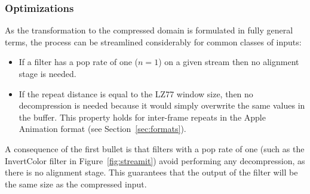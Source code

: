 \subsubsection{Optimizations}
\label{sec:opt}

As the transformation to the compressed domain is formulated in
fully general terms, the process can be streamlined considerably for
common classes of inputs:
\begin{itemize}
\item If a filter has a pop rate of one ($n=1$) on a given stream then
  no alignment stage is needed.
\item If the repeat distance is equal to the LZ77 window size, then no
  decompression is needed because it would simply overwrite the same
  values in the buffer.  This property holds for inter-frame repeats
  in the Apple Animation format (see Section~\ref{sec:formats}).
\end{itemize}
A consequence of the first bullet is that filters with a pop rate of
one (such as the InvertColor filter in Figure~\ref{fig:streamit}) avoid
performing any decompression, as there is no alignment stage.  This
guarantees that the output of the filter will be the same size as the
compressed input.





